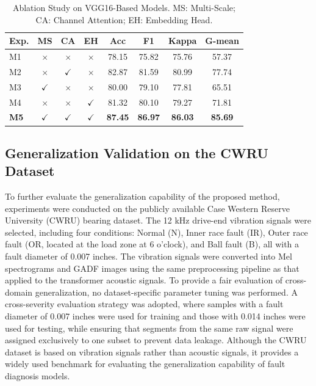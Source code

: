 \documentclass[anonymous]{iopjournal}
\begin{document}
\begin{table}
	\centering
	\caption{Ablation Study on VGG16-Based Models. MS: Multi-Scale; CA: Channel Attention; EH: Embedding Head.}
	\label{tab:ablation_vgg16}
	\renewcommand{\arraystretch}{1.2}
	\small
		\begin{tabular}{lccccccc}
			\hline
			\textbf{Exp.} & \textbf{MS} & \textbf{CA} & \textbf{EH} & \textbf{Acc} & \textbf{F1} & \textbf{Kappa} & \textbf{G-mean} \\
			\hline
			M1 & $\times$ & $\times$ & $\times$ & 78.15 & 75.82 & 75.76 & 57.37 \\
			M2 & $\times$ & $\checkmark$ & $\times$ & 82.87 & 81.59 & 80.99 & 77.74 \\
			M3 & $\checkmark$ &$\times$ & $\times$ & 80.00 & 79.10 & 77.81 & 65.51 \\
			M4 & $\times$ & $\times$ & $\checkmark$ & 81.32 & 80.10 & 79.27 & 71.81 \\
			\textbf{M5} & $\checkmark$ & $\checkmark$ & $\checkmark$ & \textbf{87.45} & \textbf{86.97} & \textbf{86.03} & \textbf{85.69} \\
			\hline
		\end{tabular}
\end{table}



\subsection{Generalization Validation on the CWRU Dataset}
To further evaluate the generalization capability of the proposed method, experiments were conducted on the publicly available Case Western Reserve University (CWRU) bearing dataset. The 12 kHz drive-end vibration signals were selected, including four conditions: Normal (N), Inner race fault (IR), Outer race fault (OR, located at the load zone at 6 o’clock), and Ball fault (B), all with a fault diameter of 0.007 inches. The vibration signals were converted into Mel spectrograms and GADF images using the same preprocessing pipeline as that applied to the transformer acoustic signals. To provide a fair evaluation of cross-domain generalization, no dataset-specific parameter tuning was performed. A cross-severity evaluation strategy was adopted, where samples with a fault diameter of 0.007 inches were used for training and those with 0.014 inches were used for testing, while ensuring that segments from the same raw signal were assigned exclusively to one subset to prevent data leakage. Although the CWRU dataset is based on vibration signals rather than acoustic signals, it provides a widely used benchmark for evaluating the generalization capability of fault diagnosis models.
\end{document}

